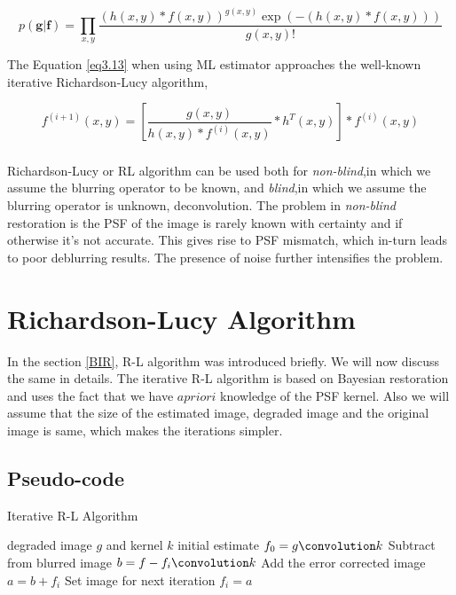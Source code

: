 \documentclass[a4paper]{book}
\begin{document}
\begin{equation}
	\label{eq3.13}
	p(\textbf{g}|\textbf{f}) = \prod_{x,y}\frac{\left(h(x,y)*f(x,y)\right)^{g(x,y)}\exp \left(-(h(x,y)*f(x,y))\right)}{g(x,y)!}
\end{equation}

%
The Equation \ref{eq3.13} when using ML estimator approaches the well-known iterative Richardson-Lucy algorithm,

\begin{equation}
	\label{eq3.14}
	f^{(i+1)}(x,y) = \left[\frac{g(x,y)}{h(x,y)*f^{(i)}(x,y)}*h^T(x,y)\right]*f^{(i)}(x,y)
\end{equation}
\paragraph*{} Richardson-Lucy or RL algorithm can be used both for \textit{non-blind},in which we assume the blurring operator to be known, and \textit{blind},in which we assume the blurring operator is unknown, deconvolution. The problem in \textit{non-blind} restoration is the PSF of the image is rarely known with certainty and if otherwise it's not accurate. This gives rise to PSF mismatch, which in-turn leads to poor deblurring results. The presence of noise further intensifies the problem.


\chapter{Richardson-Lucy Algorithm}
\thispagestyle{empty}
In the section \ref{BIR}, R-L algorithm was introduced briefly. We will now discuss the same in details. The iterative R-L algorithm is based on Bayesian restoration and uses the fact that we have $ a priori $ knowledge of the PSF kernel. Also we will assume that the size of the estimated image, degraded image and the original image is same, which makes the iterations simpler.
\section{\Large Pseudo-code}
\begin{algorithm}
	\caption{Iterative R-L Algorithm}
	\label{alg4}
	\begin{algorithmic}
		\STATE degraded image $ g $ and kernel $ k $
		\STATE initial estimate $ f_0 = g \convolution k $
			\STATE Subtract from blurred image $b = f - f_i \convolution k $
			\STATE Add the error corrected image $ a = b + f_i $
			\STATE Set image for next iteration $ f_i = a $
		\ENDFOR
	\end{algorithmic}
\end{algorithm}
\newpage
\end{document}
